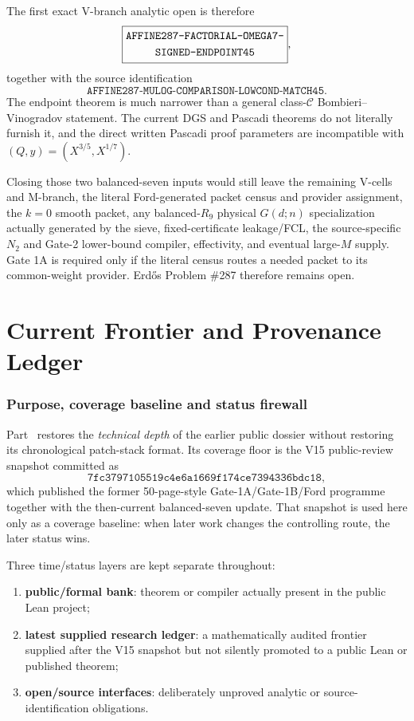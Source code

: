 \documentclass[11pt]{article}
\theoremstyle{definition}
\newcommand{\1}{\mathbf 1}
\begin{document}
{{{The first exact V-branch analytic open is therefore
\[
\boxed{\begin{gathered}\text{\ttfamily AFFINE287-FACTORIAL-OMEGA7-}\\\text{\ttfamily SIGNED-ENDPOINT45}\end{gathered}},
\]
together with the source identification
\[
\boxed{\texttt{AFFINE287-MULOG-COMPARISON-LOWCOND-MATCH45}}.
\]
The endpoint theorem is much narrower than a general class-$\mathcal C$ Bombieri--Vinogradov
statement.  The current DGS and Pascadi theorems do not literally furnish it, and the
direct written Pascadi proof parameters are incompatible with
$(Q,y)=(X^{3/5},X^{1/7})$.

Closing those two balanced-seven inputs would still leave the remaining V-cells and M-branch, the literal
Ford-generated packet census and provider assignment, the $k=0$ smooth packet, any balanced-$R_9$ physical
$G(d;n)$ specialization actually generated by the sieve, fixed-certificate leakage/FCL, the source-specific
$N_2$ and Gate-2 lower-bound compiler, effectivity, and eventual large-$M$ supply.  Gate 1A is required only if
the literal census routes a needed packet to its common-weight provider.  Erd\H{o}s Problem \#287 therefore
remains open.


\clearpage
\part{Current Frontier and Provenance Ledger}
\label{part:technical-ledger}

\section{Purpose, coverage baseline and status firewall}
\label{sec:technical-baseline}

Part~\ref{part:technical-ledger} restores the \emph{technical depth} of the earlier public
dossier without restoring its chronological patch-stack format.  Its coverage floor is the
V15 public-review snapshot committed as
\[
\boxed{\texttt{7fc3797105519c4e6a1669f174ce7394336bdc18}},
\]
which published the former 50-page-style Gate-1A/Gate-1B/Ford programme together with the
then-current balanced-seven update.  That snapshot is used here only as a coverage baseline:
when later work changes the controlling route, the later status wins.

Three time/status layers are kept separate throughout:
\begin{enumerate}[leftmargin=1.7em]
\item \textbf{public/formal bank}: theorem or compiler actually present in the public Lean
  project;
\item \textbf{latest supplied research ledger}: a mathematically audited frontier supplied
  after the V15 snapshot but not silently promoted to a public Lean or published theorem;
\item \textbf{open/source interfaces}: deliberately unproved analytic or source-identification
  obligations.
\end{enumerate}

}}}
\end{document}
